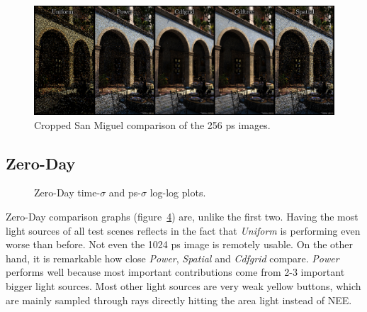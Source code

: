 \begin{figure}
    \centering
    \includegraphics[width=1\textwidth]{figures/comparisons/Mig_comp_same_slimmer.pdf}
    \caption{Cropped San Miguel comparison of the 256 ps images.}
    \label{fig:migcomp}
\end{figure}

\FloatBarrier
\subsection{Zero-Day}

\begin{figure}
    \centering
    \begin{subfigure}{.5\textwidth}
      \centering
        \caption{}
        \label{fig:zd_t}
    \end{subfigure}%
    \begin{subfigure}{.5\textwidth}
        \caption{}
        \label{fig:zd_ps}
    \end{subfigure}
    \caption{Zero-Day time-$\sigma$ and ps-$\sigma$ log-log plots.}
    \label{fig:zd}
\end{figure}

Zero-Day comparison graphs (figure~\ref{fig:zd}) are, unlike the first two. Having the most light sources of all test scenes reflects in the fact that \textit{Uniform} is performing even worse than before. Not even the 1024 ps image is remotely usable. On the other hand, it is remarkable how close \textit{Power}, \textit{Spatial} and \textit{Cdfgrid} compare. \textit{Power} performs well because most important contributions come from 2-3 important bigger light sources. Most other light sources are very weak yellow buttons, which are mainly sampled through rays directly hitting the area light instead of NEE.

